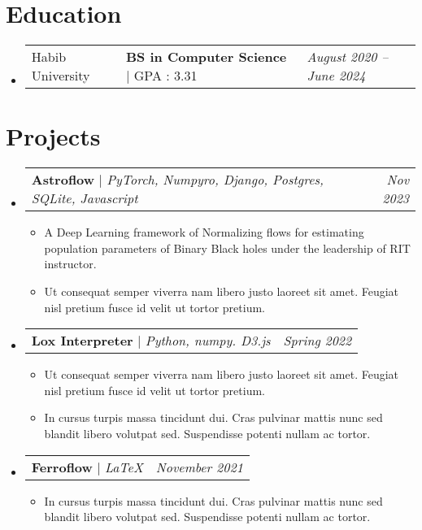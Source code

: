 \documentclass[letterpaper,10pt]{article}
\makeatletter
\newcommand{\subheadingtitlevspace}{
\vspace{-3pt}
}
\newcommand{\resumeItem}[1]{
  \item{
    {#1 \vspace{-4pt}}
  }
}
\newcommand{\titleItem}[1]{
  \textbf{#1}
}
\newcommand{\resumeSubheading}[4]{
  \item
     \begin{tabular*}{0.97\textwidth}[t]{l@{\extracolsep{\fill}}l@{}l}     
      {#1} & \titleItem{#3} | {#2} & \textit{#4}\\
    \end{tabular*}\vspace{-10pt}
}
\newcommand{\resumeProjectHeading}[2]{
    \item
    \begin{tabular*}{0.97\textwidth}{l@{\extracolsep{\fill}}r}
      #1 & \textit{ #2} \\
    \end{tabular*}\vspace{-9pt}
}
\newcommand{\resumeSubHeadingListStart}{\subheadingtitlevspace\begin{itemize}[leftmargin=0.15in, label={}]}
\newcommand{\resumeSubHeadingListEnd}{\end{itemize}}
\newcommand{\resumeItemListStart}{
\begin{itemize}}
\newcommand{\resumeItemListEnd}{
\end{itemize}\vspace{-8pt}}
\makeatother
\begin{document}
\section{Education}
\resumeSubHeadingListStart
\resumeSubheading
{Habib University}{GPA : 3.31}
{BS in Computer Science}{August 2020 -- June 2024}
\resumeSubHeadingListEnd
\vspace{-8pt}


\section{Projects}
\resumeSubHeadingListStart
\resumeProjectHeading
{\titleItem{Astroflow} $|$ \emph{PyTorch, Numpyro, Django, Postgres, SQLite, Javascript}}{Nov 2023}
\resumeItemListStart
\resumeItem{A Deep Learning framework of Normalizing flows for estimating population parameters of Binary Black holes under the leadership of RIT instructor.}
\resumeItem{Ut consequat semper viverra nam libero justo laoreet sit amet. Feugiat nisl pretium fusce id velit ut tortor pretium.}
\resumeItemListEnd
\resumeProjectHeading
{\titleItem{Lox Interpreter} $|$ \emph{Python, numpy. D3.js}}{Spring 2022}
\resumeItemListStart
\resumeItem{Ut consequat semper viverra nam libero justo laoreet sit amet. Feugiat nisl pretium fusce id velit ut tortor pretium.}
\resumeItem{In cursus turpis massa tincidunt dui. Cras pulvinar mattis nunc sed blandit libero volutpat sed. Suspendisse potenti nullam ac tortor. }
\resumeItemListEnd
\resumeProjectHeading
{\titleItem{Ferroflow} $|$ \emph{\LaTeX}}{November 2021}
\resumeItemListStart
\resumeItem{In cursus turpis massa tincidunt dui. Cras pulvinar mattis nunc sed blandit libero volutpat sed. Suspendisse potenti nullam ac tortor. }
\resumeItemListEnd
\resumeSubHeadingListEnd

\end{document}
